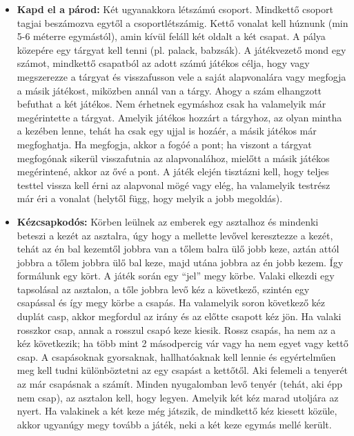 \documentclass[a4paper, 12pt, twoside, openright]{article}
\begin{document}
\begin{itemize}
\item \textbf{Kapd el a párod:} Két ugyanakkora létszámú csoport. Mindkettő csoport tagjai beszámozva egytől a csoportlétszámig. Kettő vonalat kell húznunk (min 5-6 méterre egymástól), amin kívül feláll két oldalt a két csapat. A pálya közepére egy tárgyat kell tenni (pl. palack, babzsák). A játékvezető mond egy számot, mindkettő csapatból az adott számú játékos célja, hogy vagy megszerezze a tárgyat és visszafusson vele a saját alapvonalára vagy megfogja a másik játékost, miközben annál van a tárgy. Ahogy a szám elhangzott befuthat a két játékos. Nem érhetnek egymáshoz csak ha valamelyik már megérintette a tárgyat. Amelyik játékos hozzárt a tárgyhoz, az olyan mintha a kezében lenne, tehát ha csak egy ujjal is hozáér, a másik játékos már megfoghatja. Ha megfogja, akkor a fogóé a pont; ha viszont a tárgyat megfogónak sikerül visszafutnia az alapvonalához, mielőtt a másik játékos megérintené, akkor az ővé a pont. A játék elején tisztázni kell, hogy teljes testtel vissza kell érni az alapvonal mögé vagy elég, ha valamelyik testrész már éri a vonalat (helytől függ, hogy melyik a jobb megoldás).

\item \textbf{Kézcsapkodós:} Körben leülnek az emberek egy asztalhoz és mindenki beteszi a kezét az asztalra, úgy hogy a mellette levővel keresztezze a kezét, tehát az én bal kezemtől jobbra van a tőlem balra ülő jobb keze, aztán attól jobbra a tőlem jobbra ülő bal keze, majd utána jobbra az én jobb kezem. Így formálunk egy kört. A játék során egy ``jel'' megy körbe. Valaki elkezdi egy tapsolásal az asztalon, a tőle jobbra levő kéz a következő, szintén egy csapással és így megy körbe a csapás. Ha valamelyik soron következő kéz duplát casp, akkor megfordul az irány és az előtte csapott kéz jön. Ha valaki rosszkor csap, annak a rosszul csapó keze kiesik. Rossz csapás, ha nem az a kéz következik; ha több mint 2 másodpercig vár vagy ha nem egyet vagy kettő csap. A csapásoknak gyorsaknak, hallhatóaknak kell lennie és egyértelműen meg kell tudni különböztetni az egy csapást a kettőtől. Aki felemeli a tenyerét az már csapásnak a számít. Minden nyugalomban levő tenyér (tehát, aki épp nem csap), az asztalon kell, hogy legyen. Amelyik két kéz marad utoljára az nyert. Ha valakinek a két keze még játszik, de mindkettő kéz kiesett közüle, akkor ugyanúgy megy tovább a játék, neki a két keze egymás mellé került.


\end{itemize}
\end{document}
